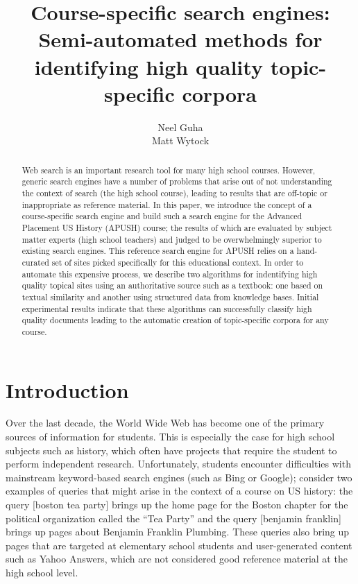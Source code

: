 \documentclass[pdfpagelabels=false,plainpages=true]{acm_proc_article-sp}
\begin{document}
\title{Course-specific search engines: Semi-automated methods for identifying
  high quality topic-specific corpora} 

\author{
  \alignauthor
  Neel Guha \\
  \alignauthor
  Matt Wytock \\
}

\maketitle
\begin{abstract}
Web search is an important research tool for many high school courses. However,
generic search engines have a number of problems that arise out of
not understanding the context of search (the high school course),
leading to results that are off-topic or inappropriate as reference material. In
this paper, we introduce the concept of a course-specific search 
engine and build such a search engine for the Advanced Placement US
History (APUSH) course; the results of which are evaluated by subject matter experts (high
school teachers) and judged to be overwhelmingly superior to existing search
engines. This reference search engine for APUSH relies on a hand-curated set of
sites picked specifically for this educational context. In order to automate
this expensive process, we describe two algorithms for indentifying high quality
topical sites using an authoritative source such as a textbook: one based
on textual similarity and another using structured data from knowledge bases. 
Initial experimental results indicate that these algorithms can successfully
classify high quality documents leading to the automatic creation of
topic-specific corpora for any course.
\end{abstract}

\section{Introduction}

Over the last decade, the World Wide Web has become one of the primary sources
of information for students. This is especially the case for high school
subjects such as history, which often have projects that require the student to 
perform independent research. Unfortunately, students encounter difficulties
with mainstream keyword-based search engines (such as Bing or Google); 
consider two examples of queries that might arise in the context of a course
on US history: the query [boston tea party] brings up the home page for the
Boston chapter for the political organization called the ``Tea Party'' and the
query [benjamin franklin] brings up pages about Benjamin Franklin
Plumbing. These queries also bring up pages that are targeted at elementary
school students and user-generated content such as Yahoo Answers, which are not
considered good reference material at the high school level.
\end{document}

